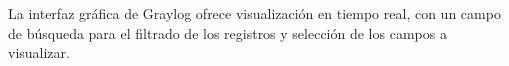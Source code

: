 \label{fig:graylog}
\captionStyle
La interfaz gráfica de Graylog ofrece visualización en tiempo real,
con un campo de búsqueda para el filtrado de los registros y selección
de los campos a visualizar.

